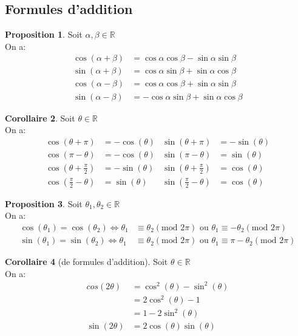 \documentclass[10pt,a4paper]{article}
\theoremstyle{definition}
\newtheorem{proposition}{Proposition}[section]
\newtheorem{corollaire}[proposition]{Corollaire}
\begin{document}
\subsection{Formules d'addition}
\begin{proposition}
Soit $\alpha, \beta \in \mathbb{R}$ \\
On a:
\begin{align*}
\cos(\alpha + \beta) &= \cos\alpha \cos\beta - \sin\alpha \sin\beta \\
\sin(\alpha + \beta) &= \cos\alpha \sin\beta + \sin\alpha \cos\beta \\
\cos(\alpha - \beta) &= \cos\alpha \cos\beta + \sin\alpha \sin\beta \\
\sin(\alpha - \beta) &= -\cos\alpha \sin\beta + \sin\alpha \cos\beta
\end{align*}
\end{proposition}
\begin{corollaire}
Soit $\theta \in \mathbb{R}$ \\
On a:
\begin{align*}
\cos(\theta + \pi) &= -\cos(\theta) & \sin(\theta + \pi) &= -\sin(\theta) \\
\cos(\pi - \theta) &= -\cos(\theta) & \sin(\pi - \theta) &= \sin(\theta) \\
\cos\left(\theta + \frac{\pi}{2}\right) &= -\sin(\theta) & \sin\left(\theta + \frac{\pi}{2}\right) &= \cos(\theta) \\
\cos\left(\frac{\pi}{2} - \theta\right) &= \sin(\theta) & \sin\left(\frac{\pi}{2} - \theta\right) &= \cos(\theta)
\end{align*}
\end{corollaire}
\begin{proposition}
Soit $\theta_1, \theta_2 \in \mathbb{R}$ \\
On a:
\begin{align*}
\cos(\theta_1) = \cos(\theta_2) \iff \theta_1 &\equiv \theta_2 (\text{mod }2\pi) \text{ ou } \theta_1 \equiv -\theta_2 (\text{mod }2\pi) \\
\sin(\theta_1) = \sin(\theta_2) \iff \theta_1 &\equiv \theta_2 (\text{mod }2\pi) \text{ ou } \theta_1 \equiv \pi - \theta_2 (\text{mod }2\pi)
\end{align*}
\end{proposition}
\begin{corollaire}[de formules d'addition]
Soit $\theta \in \mathbb{R}$ \\
On a:
\begin{align*}
cos(2\theta) &= \cos^2(\theta) - \sin^2(\theta) \\
&= 2\cos^2(\theta) - 1 \\
&= 1 - 2\sin^2(\theta) \\
\sin(2\theta) &= 2\cos(\theta)\sin(\theta)
\end{align*}
\end{corollaire}
\end{document}
